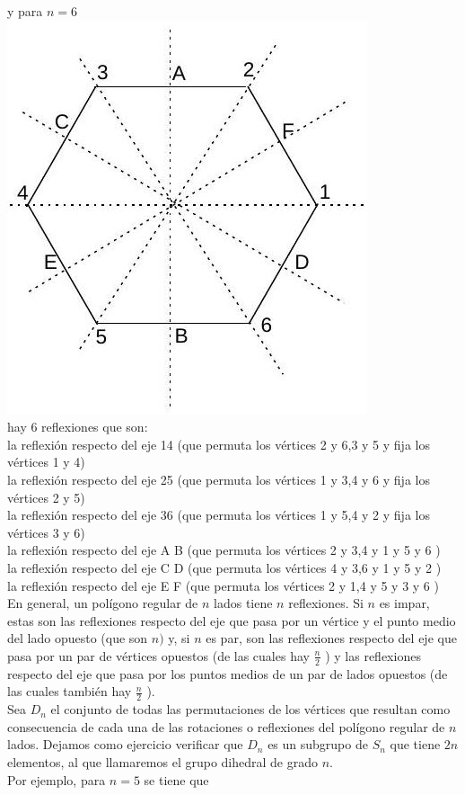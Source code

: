 \documentclass[10pt]{article}
\begin{document}
y para $n=6$\\
\includegraphics[max width=\textwidth, center]{2025_09_05_3ba26226ec0baddb5a03g-47(1)}\\
hay 6 reflexiones que son:\\
la reflexión respecto del eje 14 (que permuta los vértices 2 y 6,3 y 5 y fija los vértices 1 y 4)\\
la reflexión respecto del eje 25 (que permuta los vértices 1 y 3,4 y 6 y fija los vértices 2 y 5)\\
la reflexión respecto del eje 36 (que permuta los vértices 1 y 5,4 y 2 y fija los vértices 3 y 6)\\
la reflexión respecto del eje A B (que permuta los vértices 2 y 3,4 y 1 y 5 y 6 )\\
la reflexión respecto del eje C D (que permuta los vértices 4 y 3,6 y 1 y 5 y 2 )\\
la reflexión respecto del eje E F (que permuta los vértices 2 y 1,4 y 5 y 3 y 6 )\\
En general, un polígono regular de $n$ lados tiene $n$ reflexiones. Si $n$ es impar, estas son las reflexiones respecto del eje que pasa por un vértice y el punto medio del lado opuesto (que son $n)$ y, si $n$ es par, son las reflexiones respecto del eje que pasa por un par de vértices opuestos (de las cuales hay $\frac{n}{2}$ ) y las reflexiones respecto del eje que pasa por los puntos medios de un par de lados opuestos (de las cuales también hay $\frac{n}{2}$ ).\\
Sea $D_{n}$ el conjunto de todas las permutaciones de los vértices que resultan como consecuencia de cada una de las rotaciones o reflexiones del polígono regular de $n$ lados. Dejamos como ejercicio verificar que $D_{n}$ es un subgrupo de $S_{n}$ que tiene $2 n$ elementos, al que llamaremos el grupo dihedral de grado $n$.\\
Por ejemplo, para $n=5$ se tiene que
\end{document}
